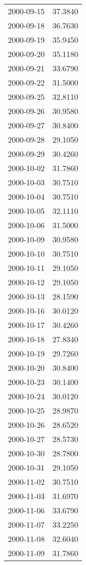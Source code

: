 \begin{tabular}{lr}
2000-09-15 &     37.3840 \\
2000-09-18 &     36.7630 \\
2000-09-19 &     35.9450 \\
2000-09-20 &     35.1180 \\
2000-09-21 &     33.6790 \\
2000-09-22 &     31.5000 \\
2000-09-25 &     32.8110 \\
2000-09-26 &     30.9580 \\
2000-09-27 &     30.8400 \\
2000-09-28 &     29.1050 \\
2000-09-29 &     30.4260 \\
2000-10-02 &     31.7860 \\
2000-10-03 &     30.7510 \\
2000-10-04 &     30.7510 \\
2000-10-05 &     32.1110 \\
2000-10-06 &     31.5000 \\
2000-10-09 &     30.9580 \\
2000-10-10 &     30.7510 \\
2000-10-11 &     29.1050 \\
2000-10-12 &     29.1050 \\
2000-10-13 &     28.1590 \\
2000-10-16 &     30.0120 \\
2000-10-17 &     30.4260 \\
2000-10-18 &     27.8340 \\
2000-10-19 &     29.7260 \\
2000-10-20 &     30.8400 \\
2000-10-23 &     30.1400 \\
2000-10-24 &     30.0120 \\
2000-10-25 &     28.9870 \\
2000-10-26 &     28.6520 \\
2000-10-27 &     28.5730 \\
2000-10-30 &     28.7800 \\
2000-10-31 &     29.1050 \\
2000-11-02 &     30.7510 \\
2000-11-03 &     31.6970 \\
2000-11-06 &     33.6790 \\
2000-11-07 &     33.2250 \\
2000-11-08 &     32.6040 \\
2000-11-09 &     31.7860 \\

\end{tabular}
